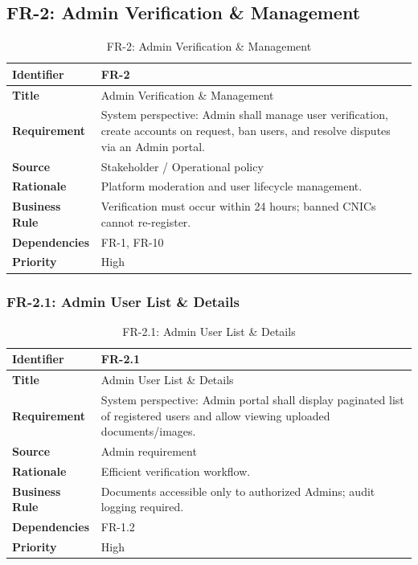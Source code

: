 \subsection{FR-2: Admin Verification \& Management}

\begin{longtable}{|p{3cm}|p{12cm}|}
\caption{FR-2: Admin Verification \& Management}
\label{tab:fr-2} \\
\hline
\rowcolor{lightgray!30}
\textbf{Identifier} & FR-2 \\
\hline
\textbf{Title} & Admin Verification \& Management \\
\hline
\textbf{Requirement} & System perspective: Admin shall manage user verification, create accounts on request, ban users, and resolve disputes via an Admin portal. \\
\hline
\textbf{Source} & Stakeholder / Operational policy \\
\hline
\textbf{Rationale} & Platform moderation and user lifecycle management. \\
\hline
\textbf{Business Rule} & Verification must occur within 24 hours; banned CNICs cannot re-register. \\
\hline
\textbf{Dependencies} & FR-1, FR-10 \\
\hline
\textbf{Priority} & High \\
\hline
\end{longtable}

\subsubsection{FR-2.1: Admin User List \& Details}

\begin{longtable}{|p{3cm}|p{12cm}|}
\caption{FR-2.1: Admin User List \& Details}
\label{tab:fr-2-1} \\
\hline
\rowcolor{lightgray!30}
\textbf{Identifier} & FR-2.1 \\
\hline
\textbf{Title} & Admin User List \& Details \\
\hline
\textbf{Requirement} & System perspective: Admin portal shall display paginated list of registered users and allow viewing uploaded documents/images. \\
\hline
\textbf{Source} & Admin requirement \\
\hline
\textbf{Rationale} & Efficient verification workflow. \\
\hline
\textbf{Business Rule} & Documents accessible only to authorized Admins; audit logging required. \\
\hline
\textbf{Dependencies} & FR-1.2 \\
\hline
\textbf{Priority} & High \\
\hline
\end{longtable}

